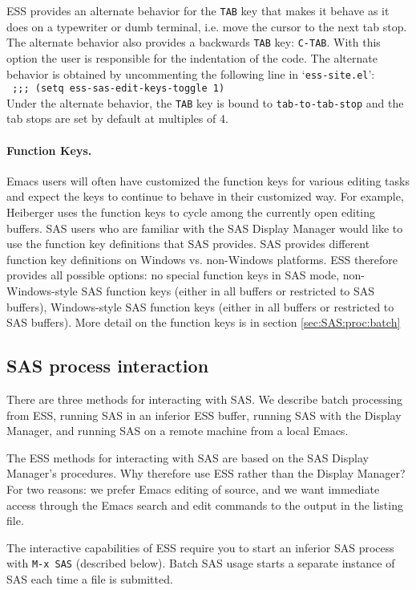 \documentclass{article}
\newcommand{\stexttt}[1]{{\small\texttt{#1}}}
\newcommand{\elcode}[1]{\\{\stexttt{\hspace*{2em} #1}}\\}
\newcommand{\file}[1]{`\stexttt{#1}'}
\begin{document}
ESS provides an alternate behavior for the \stexttt{TAB} key that
makes it behave as it does on a typewriter or dumb terminal, i.e. move the
cursor to the next tab stop.  The alternate behavior also provides a
backwards \stexttt{TAB} key: \stexttt{C-TAB}.  With this option the
user is responsible for the indentation of the code.  The alternate
behavior is obtained by uncommenting the following line in
\file{ess-site.el}: \elcode{;;; (setq ess-sas-edit-keys-toggle 1)}
Under the alternate behavior, the \stexttt{TAB} key is bound to
\stexttt{tab-to-tab-stop} and the tab stops are set by default at
multiples of 4.

\paragraph{Function Keys.}
Emacs users will often have customized the function keys for various
editing tasks and expect the keys to continue to behave in their
customized way.  For example, Heiberger uses the function keys to
cycle among the currently open editing buffers.  SAS users who are
familiar with the SAS Display Manager would like to use the function
key definitions that SAS provides.  SAS provides different function key
definitions on Windows vs. non-Windows platforms.  ESS therefore provides all
possible options: no special function keys in SAS mode, non-Windows-style SAS
function keys (either in all buffers or restricted to SAS buffers),
Windows-style SAS function keys (either in all buffers or restricted
to SAS buffers).  More detail on the function keys is in section
\ref{sec:SAS:proc:batch}


\subsection{SAS process interaction}
\label{sec:SAS:proc}

There are three methods for interacting with SAS.  We describe batch
processing from ESS, running SAS in an inferior ESS buffer, running
SAS with the Display Manager, and running SAS on a remote machine from
a local Emacs.

The ESS methods for interacting with SAS are based on the SAS Display
Manager's procedures.  Why therefore use ESS rather than the Display
Manager?  For two reasons: we prefer Emacs editing of source, and we
want immediate access through the Emacs search and edit commands to
the output in the listing file.
 

The interactive capabilities of ESS require you to start an inferior
SAS process with \stexttt{M-x SAS} (described below).  Batch SAS usage
starts a separate instance of SAS each time a file is submitted.
\end{document}
